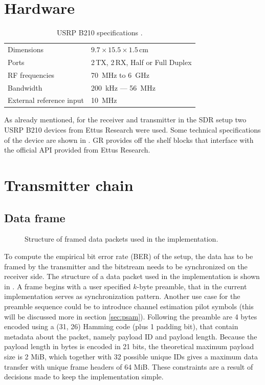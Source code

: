 \section{Hardware}

\begin{table}[h]
	\centering
	\begin{tabular}{ll}
		\toprule
		Dimensions               & \(9.7 \times 15.5 \times 1.5\)\,cm \\
		Ports                    & 2\,TX, 2\,RX, Half or Full Duplex   \\
		RF frequencies           & \SI{70}{\mega\hertz} to \SI{6}{\giga\hertz} \\
		Bandwidth                & \SI{200}{\kilo\hertz} --- \SI{56}{\mega\hertz} \\
		External reference input & \SI{10}{\mega\hertz}                         \\
		\bottomrule
	\end{tabular}
	\caption{USRP B210 specifications \cite{EttusUSRPB210}. \label{tab:usrp-specs}}
\end{table}

As already mentioned, for the receiver and transmitter in the SDR setup two USRP B210 devices from Ettus Research were used. Some technical specifications of the device are shown in . GR provides off the shelf blocks that interface with the official API provided from Ettus Research.

\section{Transmitter chain}

\subsection{Data frame} \label{sec:data-frame}

\begin{figure}
\centering

	\caption{
		Structure of framed data packets used in the implementation.
		\label{fig:dataframe}
	}
\end{figure}

To compute the empirical bit error rate (BER) of the setup, the data has to be framed by the transmitter and the bitstream needs to be synchronized on the receiver side. The structure of a data packet used in the implementation is shown in . A frame begins with a user specified \(k\)-byte preamble, that in the current implementation serves as synchronization pattern. Another use case for the preamble sequence could be to introduce channel estimation pilot symbols (this will be discussed more in section \ref{sec:psam}). Following the preamble are 4 bytes encoded using a (31, 26) Hamming code (plus 1 padding bit), that contain metadata about the packet, namely payload ID and payload length. Because the payload length in bytes is encoded in 21 bits, the theoretical maximum payload size is 2 MiB, which together with 32 possible unique IDs gives a maximum data transfer with unique frame headers of 64 MiB. These constraints are a result of decisions made to keep the implementation simple. %


